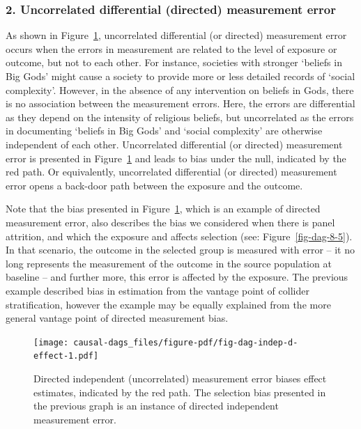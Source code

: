 \documentclass[
  singlecolumn]{report}
\begin{document}
\hypertarget{uncorrelated-differential-directed-measurement-error}{%
\subsubsection{\texorpdfstring{2. \textbf{Uncorrelated differential
(directed) measurement
error}}{2. Uncorrelated differential (directed) measurement error}}\label{uncorrelated-differential-directed-measurement-error}}

As shown in Figure~\ref{fig-dag-indep-d-effect}, uncorrelated
differential (or directed) measurement error occurs when the errors in
measurement are related to the level of exposure or outcome, but not to
each other. For instance, societies with stronger `beliefs in Big Gods'
might cause a society to provide more or less detailed records of
`social complexity'. However, in the absence of any intervention on
beliefs in Gods, there is no association between the measurement errors.
Here, the errors are differential as they depend on the intensity of
religious beliefs, but uncorrelated as the errors in documenting
`beliefs in Big Gods' and `social complexity' are otherwise independent
of each other. Uncorrelated differential (or directed) measurement error
is presented in Figure~\ref{fig-dag-indep-d-effect} and leads to bias
under the null, indicated by the red path. Or equivalently, uncorrelated
differential (or directed) measurement error opens a back-door path
between the exposure and the outcome.

Note that the bias presented in Figure~\ref{fig-dag-indep-d-effect},
which is an example of directed measurement error, also describes the
bias we considered when there is panel attrition, and which the exposure
and affects selection (see: Figure~\ref{fig-dag-8-5}). In that scenario,
the outcome in the selected group is measured with error -- it no long
represents the measurement of the outcome in the source population at
baseline -- and further more, this error is affected by the exposure.
The previous example described bias in estimation from the vantage point
of collider stratification, however the example may be equally explained
from the more general vantage point of directed measurement bias.

\begin{figure}

{\centering \texttt{[image: causal-dags\_files/figure-pdf/fig-dag-indep-d-effect-1.pdf]}

}

\caption{\label{fig-dag-indep-d-effect}Directed independent
(uncorrelated) measurement error biases effect estimates, indicated by
the red path. The selection bias presented in the previous graph is an
instance of directed independent measurement error.}

\end{figure}
\end{document}
